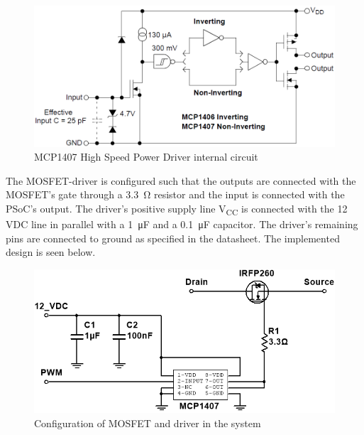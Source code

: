 \begin{figure}[H]
	\centering
	\includegraphics[width=0.7\linewidth]{Hardware/LoadSystem/GateDriver}
	\caption{MCP1407 High Speed Power Driver internal circuit}
	\label{fig:MOSFETDriverInternal}
\end{figure}

The MOSFET-driver is configured such that the outputs are connected with the MOSFET's gate through a \SI{3.3}{\ohm} resistor and the input is connected with the PSoC's output. The driver's positive supply line V\textsubscript{CC} is connected with the 12 VDC line in parallel with a \SI{1}{\micro \farad} and a \SI{0.1}{\micro \farad} capacitor. The driver's remaining pins are connected to ground as specified in the datasheet. The implemented design is seen below.

\begin{figure}[H]
	\centering
	\includegraphics[width=0.7\linewidth]{Hardware/LoadSystem/MOSFET}
	\caption{Configuration of MOSFET and driver in the system}
	\label{fig:MOSFETCircuit}
\end{figure}